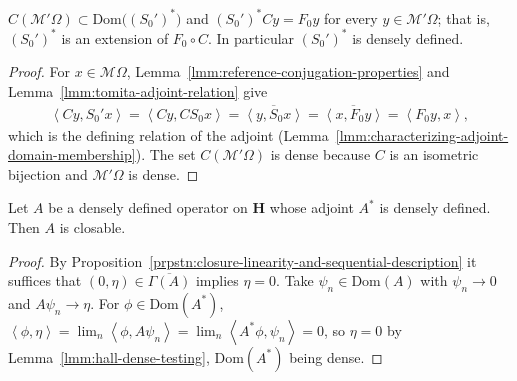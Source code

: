 \begin{lemma}
    \label{lmm:linearized-adjoint-extends}
    \leanok
    $C(\mathcal{M}'\Omega) \subset \text{Dom}\big( (S_0')^* \big)$ and $(S_0')^* C y = F_0 y$ for every $y \in \mathcal{M}'\Omega$; that is, $(S_0')^*$ is an extension of $F_0 \circ C$. In particular $(S_0')^*$ is densely defined.
\end{lemma}
\begin{proof}
    \leanok
    For $x \in \mathcal{M}\Omega$, Lemma~\ref{lmm:reference-conjugation-properties} and Lemma~\ref{lmm:tomita-adjoint-relation} give
    \begin{align}
        \left< Cy, S_0'x \right> = \left< Cy, C S_0 x \right> = \overline{\left< y, S_0x \right>} = \overline{\left< x, F_0y \right>} = \left< F_0 y, x \right>,
    \end{align}
    which is the defining relation of the adjoint (Lemma~\ref{lmm:characterizing-adjoint-domain-membership}). The set $C(\mathcal{M}'\Omega)$ is dense because $C$ is an isometric bijection and $\mathcal{M}'\Omega$ is dense.
\end{proof}

\begin{lemma}
    \label{lmm:closable-of-dense-adjoint}
    \leanok
    Let $A$ be a densely defined operator on $\mathbf{H}$ whose adjoint $A^*$ is densely defined. Then $A$ is closable.
\end{lemma}
\begin{proof}
    \leanok
    By Proposition~\ref{prpstn:closure-linearity-and-sequential-description} it suffices that $(0, \eta) \in \overline{\Gamma(A)}$ implies $\eta = 0$. Take $\psi_n \in \text{Dom}(A)$ with $\psi_n \to 0$ and $A\psi_n \to \eta$. For $\phi \in \text{Dom}(A^*)$, $\left< \phi, \eta \right> = \lim_n \left< \phi, A\psi_n \right> = \lim_n \left< A^*\phi, \psi_n \right> = 0$, so $\eta = 0$ by Lemma~\ref{lmm:hall-dense-testing}, $\text{Dom}(A^*)$ being dense.
\end{proof}

